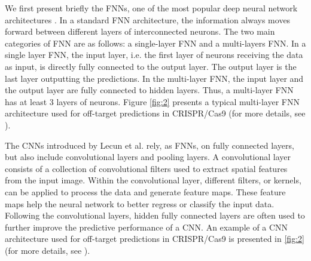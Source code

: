 \documentclass[unnumsec,webpdf,contemporary,large]{oup-authoring-template}
\theoremstyle{thmstyleone}%
\theoremstyle{thmstyletwo}%
\theoremstyle{thmstylethree}%
\begin{document}
We first present briefly the FNNs, one of the most popular deep neural network architectures \cite{heaton2018ian}. In a standard FNN architecture, the information always moves forward between different layers of interconnected neurons. The two main categories of FNN are as follows: a single-layer FNN and a multi-layers FNN. In a single layer FNN, the input layer, i.e. the first layer of neurons receiving the data as input, is directly fully connected to the output layer. The output layer is the last layer outputting the predictions. In the multi-layer FNN, the input layer and the output layer are fully connected to hidden layers. Thus, a multi-layer FNN has at least 3 layers of neurons. Figure \ref{fig:2} presents a typical multi-layer FNN architecture used for off-target predictions in CRISPR/Cas9 (for more details, see \citep{charlier2021accurate}). 

The CNNs introduced by Lecun et al. \cite{lecun1998gradient} rely, as FNNs, on fully connected layers, but also include convolutional layers and pooling layers. A convolutional layer consists of a collection of convolutional filters used to extract spatial features from the input image. Within the convolutional layer, different filters, or kernels, can be applied to process the data and generate feature maps. These feature maps help the neural network to better regress or classify the input data. Following the convolutional layers, hidden fully connected layers are often used to further improve the predictive performance of a CNN. An example of a CNN architecture used for off-target predictions in CRISPR/Cas9 is presented in \ref{fig:2} (for more details, see \citep{charlier2021accurate}).
\end{document}
